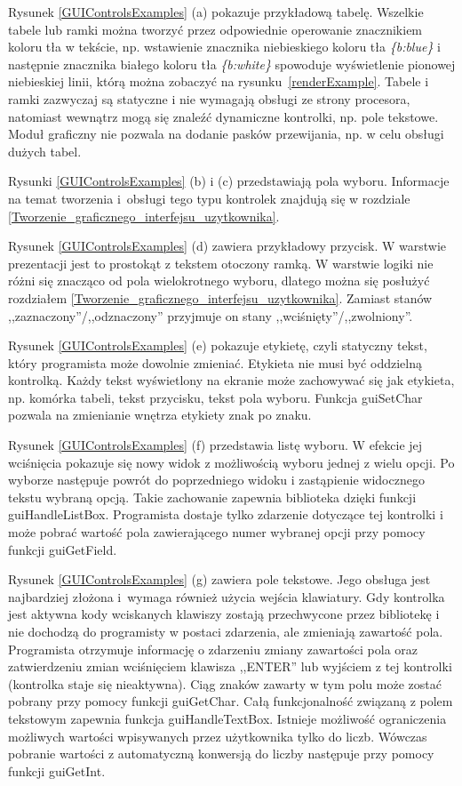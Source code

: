 Rysunek \ref{GUIControlsExamples} (a) pokazuje przykładową tabelę. Wszelkie tabele lub ramki można tworzyć przez odpowiednie operowanie znacznikiem koloru tła w tekście, np. wstawienie znacznika niebieskiego koloru tła \textit{\{b:blue\}} i następnie znacznika białego koloru tła \textit{\{b:white\}} spowoduje wyświetlenie pionowej niebieskiej linii, którą można zobaczyć na rysunku~\ref{renderExample}. Tabele i ramki zazwyczaj są statyczne i nie wymagają obsługi ze strony procesora, natomiast wewnątrz mogą się znaleźć dynamiczne kontrolki, np. pole tekstowe. Moduł graficzny nie pozwala na dodanie pasków przewijania, np. w celu obsługi dużych tabel.

Rysunki \ref{GUIControlsExamples} (b) i (c) przedstawiają pola wyboru. Informacje na temat tworzenia i~obsługi tego typu kontrolek znajdują się w rozdziale \ref{Tworzenie_graficznego_interfejsu_uzytkownika}.

Rysunek \ref{GUIControlsExamples} (d) zawiera przykładowy przycisk. W warstwie prezentacji jest to prostokąt z tekstem otoczony ramką. W warstwie logiki nie różni się znacząco od pola wielokrotnego wyboru, dlatego można się posłużyć rozdziałem \ref{Tworzenie_graficznego_interfejsu_uzytkownika}. Zamiast stanów ,,zaznaczony''/,,odznaczony'' przyjmuje on stany ,,wciśnięty''/,,zwolniony''.

Rysunek \ref{GUIControlsExamples} (e) pokazuje etykietę, czyli statyczny tekst, który programista może dowolnie zmieniać. Etykieta nie musi być oddzielną kontrolką. Każdy tekst wyświetlony na ekranie może zachowywać się jak etykieta, np. komórka tabeli, tekst przycisku, tekst pola wyboru. Funkcja {\ttfamily guiSetChar} pozwala na zmienianie wnętrza etykiety znak po znaku.

Rysunek \ref{GUIControlsExamples} (f) przedstawia listę wyboru. W efekcie jej wciśnięcia pokazuje się nowy widok z możliwością wyboru jednej z wielu opcji. Po wyborze następuje powrót do poprzedniego widoku i zastąpienie widocznego tekstu wybraną opcją. Takie zachowanie zapewnia biblioteka dzięki funkcji {\ttfamily guiHandleListBox}. Programista dostaje tylko zdarzenie dotyczące tej kontrolki i może pobrać wartość pola zawierającego numer wybranej opcji przy pomocy funkcji {\ttfamily guiGetField}.

Rysunek \ref{GUIControlsExamples} (g) zawiera pole tekstowe. Jego obsługa jest najbardziej złożona i~wymaga również użycia wejścia klawiatury. Gdy kontrolka jest aktywna kody wciskanych klawiszy zostają przechwycone przez bibliotekę i nie dochodzą do programisty w postaci zdarzenia, ale zmieniają zawartość pola. Programista otrzymuje informację o zdarzeniu zmiany zawartości pola oraz zatwierdzeniu zmian wciśnięciem klawisza ,,ENTER'' lub wyjściem z tej kontrolki (kontrolka staje się nieaktywna). Ciąg znaków zawarty w tym polu może zostać pobrany przy pomocy funkcji {\ttfamily guiGetChar}. Całą funkcjonalność związaną z polem tekstowym zapewnia funkcja {\ttfamily guiHandleTextBox}. Istnieje możliwość ograniczenia możliwych wartości wpisywanych przez użytkownika tylko do liczb. Wówczas pobranie wartości z automatyczną konwersją do liczby następuje przy pomocy funkcji {\ttfamily guiGetInt}.


